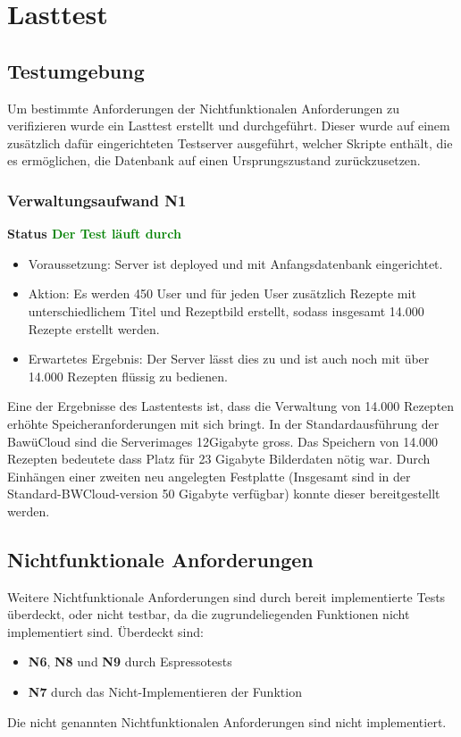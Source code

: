 \chapter{Lasttest}

\section{Testumgebung} 
Um bestimmte Anforderungen der {\grqq Nichtfunktionalen Anforderungen\grqq} zu verifizieren wurde ein Lasttest erstellt und durchgeführt. 
Dieser wurde auf einem zusätzlich dafür eingerichteten Testserver ausgeführt, welcher Skripte enthält, die es ermöglichen, die Datenbank auf einen Ursprungszustand zurückzusetzen.

\subsection{Verwaltungsaufwand N1}
\textbf{Status \textcolor{green}{Der Test läuft durch}}
\begin{itemize}
\item Voraussetzung: Server ist deployed und mit Anfangsdatenbank eingerichtet.
\item Aktion: Es werden 450 User und für jeden User zusätzlich Rezepte mit unterschiedlichem Titel und Rezeptbild erstellt, sodass insgesamt 14.000 Rezepte erstellt werden.
\item Erwartetes Ergebnis: Der Server lässt dies zu und ist auch noch mit über 14.000 Rezepten flüssig zu bedienen. 
\end{itemize}

Eine der Ergebnisse des Lastentests ist, dass die Verwaltung von 14.000 Rezepten erhöhte Speicheranforderungen mit sich bringt. In der Standardausführung der BawüCloud sind die Serverimages 12Gigabyte gross. 
Das Speichern von 14.000 Rezepten bedeutete dass Platz für 23 Gigabyte Bilderdaten nötig war. 
Durch Einhängen einer zweiten neu angelegten Festplatte (Insgesamt sind in der Standard-BWCloud-version 50 Gigabyte verfügbar) konnte dieser bereitgestellt werden. 


\section{Nichtfunktionale Anforderungen}
Weitere Nichtfunktionale Anforderungen sind durch bereit implementierte Tests überdeckt, oder nicht testbar, da die zugrundeliegenden Funktionen nicht implementiert sind.
Überdeckt sind:
\begin{itemize}[nosep]
	\item \textbf{N6}, \textbf{N8} und \textbf{N9} durch Espressotests
	\item \textbf{N7} durch das Nicht-Implementieren der Funktion
\end{itemize}
Die nicht genannten Nichtfunktionalen Anforderungen sind nicht implementiert.

